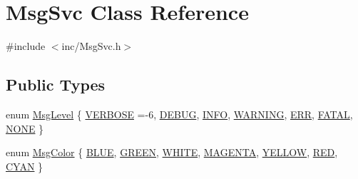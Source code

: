 \hypertarget{classMsgSvc}{}\section{Msg\+Svc Class Reference}
\label{classMsgSvc}


{\ttfamily \#include $<$inc/\+Msg\+Svc.\+h$>$}

\subsection*{Public Types}
\begin{DoxyCompactItemize}
\item 
enum \hyperlink{classMsgSvc_ae671eb7301996cd049d2da8a65925926}{Msg\+Level} \{ \newline
\hyperlink{classMsgSvc_ae671eb7301996cd049d2da8a65925926af655256b06494ade5ba830abe5401ec9}{V\+E\+R\+B\+O\+SE} =-\/6, 
\hyperlink{classMsgSvc_ae671eb7301996cd049d2da8a65925926a1dbdcc82dce88370ec335883c83b38b0}{D\+E\+B\+UG}, 
\hyperlink{classMsgSvc_ae671eb7301996cd049d2da8a65925926ad2fcf3f3e734fc41ee097cc23670ce51}{I\+N\+FO}, 
\hyperlink{classMsgSvc_ae671eb7301996cd049d2da8a65925926a7cefae88f2ba26b2b05b676a383c834b}{W\+A\+R\+N\+I\+NG}, 
\newline
\hyperlink{classMsgSvc_ae671eb7301996cd049d2da8a65925926a35a9d7166e9896af4ec8fb33bf5f1772}{E\+RR}, 
\hyperlink{classMsgSvc_ae671eb7301996cd049d2da8a65925926a59c73cb29edfc9cdf35845e2b1301363}{F\+A\+T\+AL}, 
\hyperlink{classMsgSvc_ae671eb7301996cd049d2da8a65925926a9be9ae32fed8e1e6eba4a58692210fbd}{N\+O\+NE}
 \}
\item 
enum \hyperlink{classMsgSvc_af95de99b5b2e7b6754b6d94ec5526d2c}{Msg\+Color} \{ \newline
\hyperlink{classMsgSvc_af95de99b5b2e7b6754b6d94ec5526d2ca1dcf5030a7b8beb983fd3dc8308eb066}{B\+L\+UE}, 
\hyperlink{classMsgSvc_af95de99b5b2e7b6754b6d94ec5526d2ca0b06352b93e105a1b59d246e3ab1473f}{G\+R\+E\+EN}, 
\hyperlink{classMsgSvc_af95de99b5b2e7b6754b6d94ec5526d2ca7eb16ade63c14f1eca4a79c0d3316b1e}{W\+H\+I\+TE}, 
\hyperlink{classMsgSvc_af95de99b5b2e7b6754b6d94ec5526d2cab9a69d49c8dcce5f9df100509d2b0bf0}{M\+A\+G\+E\+N\+TA}, 
\newline
\hyperlink{classMsgSvc_af95de99b5b2e7b6754b6d94ec5526d2cafc5827dd1cc81b88110254bfbdf1add2}{Y\+E\+L\+L\+OW}, 
\hyperlink{classMsgSvc_af95de99b5b2e7b6754b6d94ec5526d2ca5c5593ef0eafd0335e37f9060a0cc097}{R\+ED}, 
\hyperlink{classMsgSvc_af95de99b5b2e7b6754b6d94ec5526d2ca75e9a07cb216444b43234f5092559caf}{C\+Y\+AN}
 \}
\end{DoxyCompactItemize}
